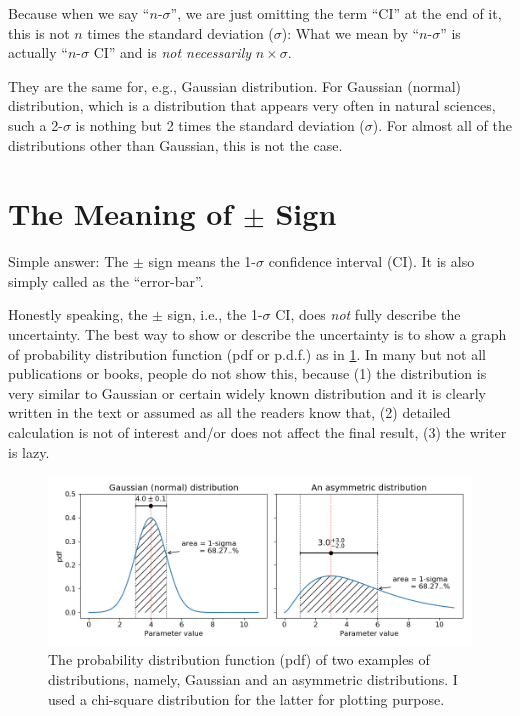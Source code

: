Because when we say ``$ n $-$ \sigma $'', we are just omitting the term ``CI'' at the end of it, this is not $ n $ times the standard deviation ($ \sigma $): What we mean by ``$ n $-$ \sigma $'' is actually ``$ n $-$ \sigma $ CI'' and is \textit{not necessarily} $ n \times \sigma $. 

They are the same for, e.g., Gaussian distribution. For Gaussian (normal) distribution, which is a distribution that appears very often in natural sciences, such a 2-$ \sigma $ is nothing but 2 times the standard deviation ($ \sigma $). For almost all of the distributions other than Gaussian, this is not the case.



\section{The Meaning of $ \pm $ Sign}
Simple answer: The $ \pm $ sign means the 1-$ \sigma $ confidence interval (CI). It is also simply called as the ``error-bar''. 

Honestly speaking, the $ \pm $ sign, i.e., the 1-$ \sigma $ CI, does \textit{not} fully describe the uncertainty. The best way to show or describe the uncertainty is to show a graph of probability distribution function (pdf or p.d.f.) as in \cref{fig:figposterior01}. In many but not all publications or books, people do not show this, because (1) the distribution is very similar to Gaussian or certain widely known distribution and it is clearly written in the text or assumed as all the readers know that, (2) detailed calculation is not of interest and/or does not affect the final result, (3) the writer is lazy. 

\begin{figure}[ht!]
\centering
\includegraphics[width=1\linewidth]{figs/fig_posterior01}
\caption{The probability distribution function (pdf) of two examples of distributions, namely, Gaussian and an asymmetric distributions. I used a chi-square distribution for the latter for plotting purpose.}
\label{fig:figposterior01}
\end{figure}


